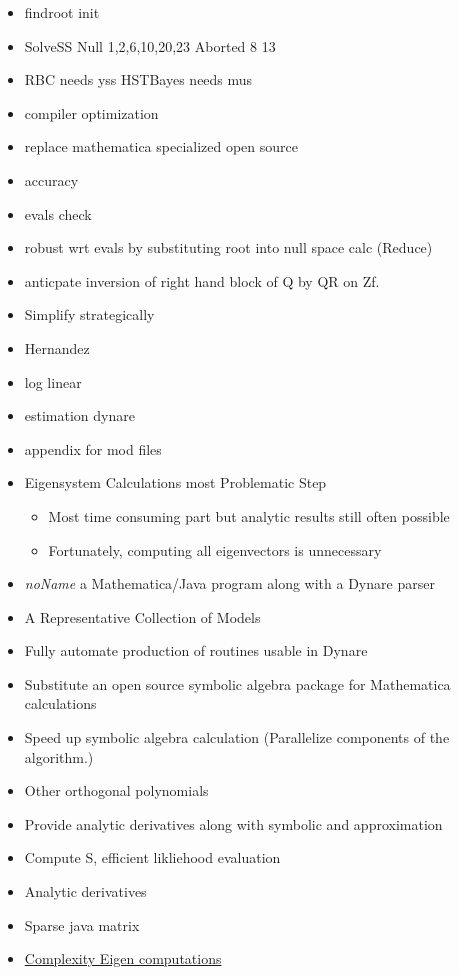 \documentclass[12pt]{elsart}
\begin{document}
  \begin{itemize}
  \item findroot init
  \item SolveSS Null 1,2,6,10,20,23 Aborted 8 13
  \item RBC needs yss HSTBayes needs mus
  \item compiler optimization
  \item replace mathematica specialized open source 
  \item accuracy
  \item evals check
  \item robust wrt evals by substituting root into null space calc (Reduce)
  \item anticpate inversion of right hand block of Q by QR on Zf.
  \item Simplify strategically
  \item Hernandez
  \item log linear
  \item estimation dynare
  \item appendix for mod files
\item Eigensystem Calculations most Problematic Step
  \begin{itemize}
  \item Most time consuming part but analytic results still often possible
  \item Fortunately, computing all eigenvectors is unnecessary
  \end{itemize}
  \item {\em noName} a Mathematica/Java program along with a Dynare parser
  \item  A Representative Collection of Models
  \end{itemize}



  \begin{itemize}
  \item Fully automate production of routines usable in Dynare
  \item Substitute an open source symbolic algebra package for Mathematica calculations
  \item Speed up symbolic algebra calculation (Parallelize components of the algorithm.)
  \item Other orthogonal polynomials
\item Provide analytic derivatives along with symbolic and approximation
\item Compute S, efficient likliehood evaluation
\item Analytic derivatives
\item Sparse java matrix
\item \href{http://cstheory.stackexchange.com/questions/2611/complexity-of-finding-the-eigendecomposition-of-a-matrix}{Complexity Eigen computations}
  \end{itemize}
\end{document}
